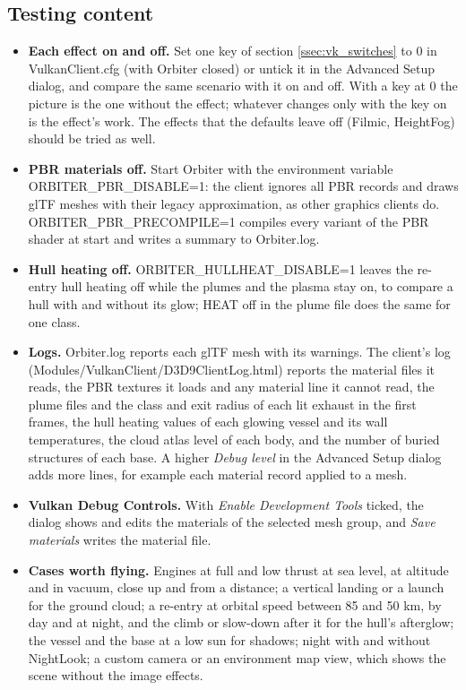 \documentclass[Orbiter Developer Manual.tex]{subfiles}
\begin{document}
\begin{sloppypar}
\subsection{Testing content}
\label{ssec:vk_testing}
\begin{itemize}
\item \textbf{Each effect on and off.} Set one key of section \ref{ssec:vk_switches} to 0 in VulkanClient.cfg (with Orbiter closed) or untick it in the Advanced Setup dialog, and compare the same scenario with it on and off. With a key at 0 the picture is the one without the effect; whatever changes only with the key on is the effect's work. The effects that the defaults leave off (Filmic, HeightFog) should be tried as well.
\item \textbf{PBR materials off.} Start Orbiter with the environment variable ORBITER\_PBR\_DISABLE=1: the client ignores all PBR records and draws glTF meshes with their legacy approximation, as other graphics clients do. ORBITER\_PBR\_PRECOMPILE=1 compiles every variant of the PBR shader at start and writes a summary to Orbiter.log.
\item \textbf{Hull heating off.} ORBITER\_HULLHEAT\_DISABLE=1 leaves the re-entry hull heating off while the plumes and the plasma stay on, to compare a hull with and without its glow; HEAT off in the plume file does the same for one class.
\item \textbf{Logs.} Orbiter.log reports each glTF mesh with its warnings. The client's log (Modules/VulkanClient/D3D9ClientLog.html) reports the material files it reads, the PBR textures it loads and any material line it cannot read, the plume files and the class and exit radius of each lit exhaust in the first frames, the hull heating values of each glowing vessel and its wall temperatures, the cloud atlas level of each body, and the number of buried structures of each base. A higher \textit{Debug level} in the Advanced Setup dialog adds more lines, for example each material record applied to a mesh.
\item \textbf{Vulkan Debug Controls.} With \textit{Enable Development Tools} ticked, the dialog shows and edits the materials of the selected mesh group, and \textit{Save materials} writes the material file.
\item \textbf{Cases worth flying.} Engines at full and low thrust at sea level, at altitude and in vacuum, close up and from a distance; a vertical landing or a launch for the ground cloud; a re-entry at orbital speed between 85 and 50 km, by day and at night, and the climb or slow-down after it for the hull's afterglow; the vessel and the base at a low sun for shadows; night with and without NightLook; a custom camera or an environment map view, which shows the scene without the image effects.
\end{itemize}

\end{sloppypar}
\end{document}
